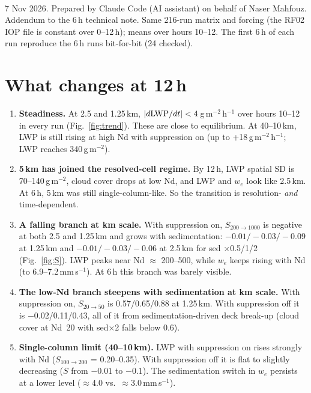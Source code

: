 \documentclass[10pt]{article}
\begin{document}
\sloppy
{}\\[2pt]
7 Nov 2026. Prepared by Claude Code (AI assistant) on behalf of Naser Mahfouz. Addendum to the 6\,h technical note.
Same 216-run matrix and forcing (the RF02 IOP file is constant over 0--12\,h); means over hours 10--12.
The first 6\,h of each run reproduce the 6\,h runs bit-for-bit (24 checked).

\section*{What changes at 12\,h}
\begin{enumerate}
\item \textbf{Steadiness.} At 2.5 and 1.25\,km, $|d{\rm LWP}/dt| < 4$\,g\,m$^{-2}$\,h$^{-1}$ over hours 10--12 in every run (Fig.~\ref{fig:trend}).
These are close to equilibrium. At 40--10\,km, LWP is still rising at high Nd with suppression on (up to +18\,g\,m$^{-2}$\,h$^{-1}$; LWP reaches 340\,g\,m$^{-2}$).
\item \textbf{5\,km has joined the resolved-cell regime.} By 12\,h, LWP spatial SD is 70--140\,g\,m$^{-2}$, cloud cover drops at low Nd, and LWP and $w_e$ look like 2.5\,km.
At 6\,h, 5\,km was still single-column-like. So the transition is resolution- \emph{and} time-dependent.
\item \textbf{A falling branch at km scale.} With suppression on, $S_{200\to1000}$ is negative at both 2.5 and 1.25\,km and grows with sedimentation:
$-0.01/-0.03/-0.09$ at 1.25\,km and $-0.01/-0.03/-0.06$ at 2.5\,km for sed $\times$0.5/1/2 (Fig.~\ref{fig:S}). LWP peaks near Nd $\approx$ 200--500,
while $w_e$ keeps rising with Nd (to 6.9--7.2\,mm\,s$^{-1}$). At 6\,h this branch was barely visible.
\item \textbf{The low-Nd branch steepens with sedimentation at km scale.} With suppression on, $S_{20\to50}$ is 0.57/0.65/0.88 at 1.25\,km.
With suppression off it is $-0.02$/0.11/0.43, all of it from sedimentation-driven deck break-up (cloud cover at Nd~20 with sed$\times$2 falls below 0.6).
\item \textbf{Single-column limit (40--10\,km).} LWP with suppression on rises strongly with Nd ($S_{100\to200}$ = 0.20--0.35).
With suppression off it is flat to slightly decreasing ($S$ from $-0.01$ to $-0.1$). The sedimentation switch in $w_e$ persists at a lower level ($\approx$4.0 vs.\ $\approx$3.0\,mm\,s$^{-1}$).
\end{enumerate}
\end{document}
